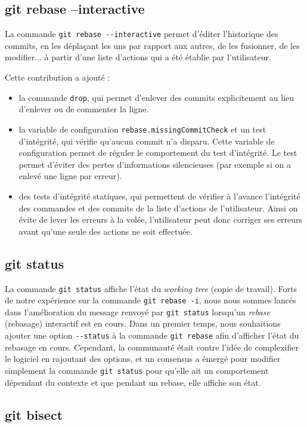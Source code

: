 \documentclass[a4paper, 12pt]{article}
\newcommand{\gitcmd}[1]{\lstinline|#1|}
\begin{document}
\subsection{git rebase --interactive}

La commande \gitcmd{git rebase --interactive} permet d'éditer l'historique des commits, en les déplaçant les uns par rapport aux autres, de les fusionner, de les modifier... à partir d'une liste d'actions qui a été établie par l'utilisateur.

Cette contribution a ajouté :
\begin{itemize}
\item la commande \gitcmd{drop}, qui permet d'enlever des commits explicitement au lieu d'enlever ou de commenter la ligne.
\item la variable de configuration \gitcmd{rebase.missingCommitCheck} et un test d'intégrité, qui vérifie qu'aucun commit n'a disparu. Cette variable de configuration permet de réguler le comportement du test d'intégrité. Le test permet d'éviter des pertes d'informations silencieuses (par exemple si on a enlevé une ligne par erreur).
\item des tests d'intégrité statiques, qui permettent de vérifier à l'avance l'intégrité des commandes et des commits de la liste d'actions de l'utilisateur. Ainsi on évite de lever les erreurs à la volée, l'utilisateur peut donc corriger ses erreurs avant qu'une seule des actions ne soit effectuée.
\end{itemize}

\subsection{git status}

La commande \gitcmd{git status} affiche l'état du \textit{working tree} (copie de travail).
Forts de notre expérience sur la commande \gitcmd{git rebase -i}, nous nous sommes lancés dans l'amélioration du message renvoyé par \gitcmd{git status} lorsqu'un \textit{rebase} (rebasage) interactif est en cours.
Dans un premier temps, nous souhaitions ajouter une option \gitcmd{--status} à la commande \gitcmd{git rebase} afin d'afficher l'état du rebasage en cours. 
Cependant, la communauté était contre l'idée de complexifier le logiciel en rajoutant des options, et un consensus a émergé pour modifier simplement la commande \gitcmd{git status} pour qu'elle ait un comportement dépendant du contexte et que pendant un rebase, elle affiche son état.

\subsection{git bisect}
\end{document}
